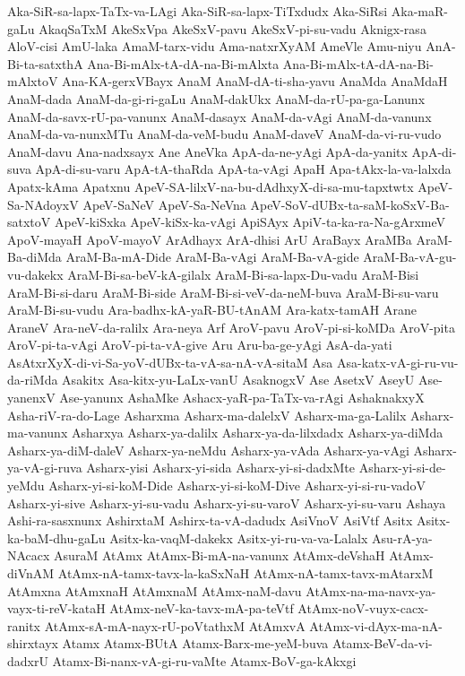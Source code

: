 {Aka-SiR-sa-lapx-TaTx-va-LAgi
Aka-SiR-sa-lapx-TiTxdudx
Aka-SiRsi
Aka-maR-gaLu
AkaqSaTxM
AkeSxVpa
AkeSxV-pavu
AkeSxV-pi-su-vadu
Aknigx-rasa
AloV-cisi
AmU-laka
AmaM-tarx-vidu
Ama-natxrXyAM
AmeVle
Amu-niyu
AnA-Bi-ta-satxthA
Ana-Bi-mAlx-tA-dA-na-Bi-mAlxta
Ana-Bi-mAlx-tA-dA-na-Bi-mAlxtoV
Ana-KA-gerxVBayx
AnaM
AnaM-dA-ti-sha-yavu
AnaMda
AnaMdaH
AnaM-dada
AnaM-da-gi-ri-gaLu
AnaM-dakUkx
AnaM-da-rU-pa-ga-Lanunx
AnaM-da-savx-rU-pa-vanunx
AnaM-dasayx
AnaM-da-vAgi
AnaM-da-vanunx
AnaM-da-va-nunxMTu
AnaM-da-veM-budu
AnaM-daveV
AnaM-da-vi-ru-vudo
AnaM-davu
Ana-nadxsayx
Ane
AneVka
ApA-da-ne-yAgi
ApA-da-yanitx
ApA-di-suva
ApA-di-su-varu
ApA-tA-thaRda
ApA-ta-vAgi
ApaH
Apa-tAkx-la-va-lalxda
Apatx-kAma
Apatxnu
ApeV-SA-lilxV-na-bu-dAdhxyX-di-sa-mu-tapxtwtx
ApeV-Sa-NAdoyxV
ApeV-SaNeV
ApeV-Sa-NeVna
ApeV-SoV-dUBx-ta-saM-koSxV-Ba-satxtoV
ApeV-kiSxka
ApeV-kiSx-ka-vAgi
ApiSAyx
ApiV-ta-ka-ra-Na-gArxmeV
ApoV-mayaH
ApoV-mayoV
ArAdhayx
ArA-dhisi
ArU
AraBayx
AraMBa
AraM-Ba-diMda
AraM-Ba-mA-Dide
AraM-Ba-vAgi
AraM-Ba-vA-gide
AraM-Ba-vA-gu-vu-dakekx
AraM-Bi-sa-beV-kA-gilalx
AraM-Bi-sa-lapx-Du-vadu
AraM-Bisi
AraM-Bi-si-daru
AraM-Bi-side
AraM-Bi-si-veV-da-neM-buva
AraM-Bi-su-varu
AraM-Bi-su-vudu
Ara-badhx-kA-yaR-BU-tAnAM
Ara-katx-tamAH
Arane
AraneV
Ara-neV-da-ralilx
Ara-neya
Arf
AroV-pavu
AroV-pi-si-koMDa
AroV-pita
AroV-pi-ta-vAgi
AroV-pi-ta-vA-give
Aru
Aru-ba-ge-yAgi
AsA-da-yati
AsAtxrXyX-di-vi-Sa-yoV-dUBx-ta-vA-sa-nA-vA-sitaM
Asa
Asa-katx-vA-gi-ru-vu-da-riMda
Asakitx
Asa-kitx-yu-LaLx-vanU
AsaknogxV
Ase
AsetxV
AseyU
Ase-yanenxV
Ase-yanunx
AshaMke
Ashacx-yaR-pa-TaTx-va-rAgi
AshaknakxyX
Asha-riV-ra-do-Lage
Asharxma
Asharx-ma-dalelxV
Asharx-ma-ga-Lalilx
Asharx-ma-vanunx
Asharxya
Asharx-ya-dalilx
Asharx-ya-da-lilxdadx
Asharx-ya-diMda
Asharx-ya-diM-daleV
Asharx-ya-neMdu
Asharx-ya-vAda
Asharx-ya-vAgi
Asharx-ya-vA-gi-ruva
Asharx-yisi
Asharx-yi-sida
Asharx-yi-si-dadxMte
Asharx-yi-si-de-yeMdu
Asharx-yi-si-koM-Dide
Asharx-yi-si-koM-Dive
Asharx-yi-si-ru-vadoV
Asharx-yi-sive
Asharx-yi-su-vadu
Asharx-yi-su-varoV
Asharx-yi-su-varu
Ashaya
Ashi-ra-sasxnunx
AshirxtaM
Ashirx-ta-vA-dadudx
AsiVnoV
AsiVtf
Asitx
Asitx-ka-baM-dhu-gaLu
Asitx-ka-vaqM-dakekx
Asitx-yi-ru-va-va-Lalalx
Asu-rA-ya-NAcacx
AsuraM
AtAmx
AtAmx-Bi-mA-na-vanunx
AtAmx-deVshaH
AtAmx-diVnAM
AtAmx-nA-tamx-tavx-la-kaSxNaH
AtAmx-nA-tamx-tavx-mAtarxM
AtAmxna
AtAmxnaH
AtAmxnaM
AtAmx-naM-davu
AtAmx-na-ma-navx-ya-vayx-ti-reV-kataH
AtAmx-neV-ka-tavx-mA-pa-teVtf
AtAmx-noV-vuyx-cacx-ranitx
AtAmx-sA-mA-nayx-rU-poVtathxM
AtAmxvA
AtAmx-vi-dAyx-ma-nA-shirxtayx
Atamx
Atamx-BUtA
Atamx-Barx-me-yeM-buva
Atamx-BeV-da-vi-dadxrU
Atamx-Bi-nanx-vA-gi-ru-vaMte
Atamx-BoV-ga-kAkxgi
}
